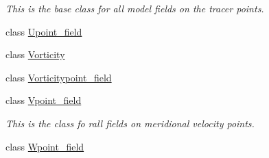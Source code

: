 \begin{DoxyCompactItemize}
\begin{DoxyCompactList}\small\item\em This is the base class for all model fields on the tracer points. \end{DoxyCompactList}\item 
class \hyperlink{classmitgcm_1_1core_1_1Upoint__field}{Upoint\+\_\+field}
\item 
class \hyperlink{classmitgcm_1_1core_1_1Vorticity}{Vorticity}
\item 
class \hyperlink{classmitgcm_1_1core_1_1Vorticitypoint__field}{Vorticitypoint\+\_\+field}
\item 
class \hyperlink{classmitgcm_1_1core_1_1Vpoint__field}{Vpoint\+\_\+field}
\begin{DoxyCompactList}\small\item\em This is the class fo rall fields on meridional velocity points. \end{DoxyCompactList}\item 
class \hyperlink{classmitgcm_1_1core_1_1Wpoint__field}{Wpoint\+\_\+field}
\end{DoxyCompactItemize}
